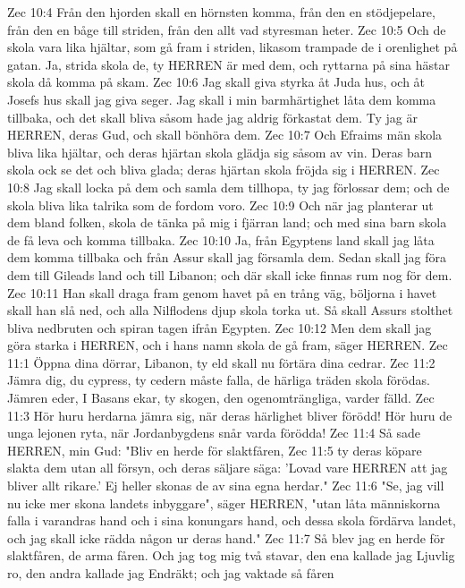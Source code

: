 Zec 10:4  Från den hjorden skall en hörnsten komma, från den en stödjepelare, från den en båge till striden, från den allt vad styresman heter.
Zec 10:5  Och de skola vara lika hjältar, som gå fram i striden, likasom trampade de i orenlighet på gatan. Ja, strida skola de, ty HERREN är med dem, och ryttarna på sina hästar skola då komma på skam.
Zec 10:6  Jag skall giva styrka åt Juda hus, och åt Josefs hus skall jag giva seger. Jag skall i min barmhärtighet låta dem komma tillbaka, och det skall bliva såsom hade jag aldrig förkastat dem. Ty jag är HERREN, deras Gud, och skall bönhöra dem.
Zec 10:7  Och Efraims män skola bliva lika hjältar, och deras hjärtan skola glädja sig såsom av vin. Deras barn skola ock se det och bliva glada; deras hjärtan skola fröjda sig i HERREN.
Zec 10:8  Jag skall locka på dem och samla dem tillhopa, ty jag förlossar dem; och de skola bliva lika talrika som de fordom voro.
Zec 10:9  Och när jag planterar ut dem bland folken, skola de tänka på mig i fjärran land; och med sina barn skola de få leva och komma tillbaka.
Zec 10:10  Ja, från Egyptens land skall jag låta dem komma tillbaka och från Assur skall jag församla dem. Sedan skall jag föra dem till Gileads land och till Libanon; och där skall icke finnas rum nog för dem.
Zec 10:11  Han skall draga fram genom havet på en trång väg, böljorna i havet skall han slå ned, och alla Nilflodens djup skola torka ut. Så skall Assurs stolthet bliva nedbruten och spiran tagen ifrån Egypten.
Zec 10:12  Men dem skall jag göra starka i HERREN, och i hans namn skola de gå fram, säger HERREN.
Zec 11:1  Öppna dina dörrar, Libanon, ty eld skall nu förtära dina cedrar.
Zec 11:2  Jämra dig, du cypress, ty cedern måste falla, de härliga träden skola förödas. Jämren eder, I Basans ekar, ty skogen, den ogenomträngliga, varder fälld.
Zec 11:3  Hör huru herdarna jämra sig, när deras härlighet bliver förödd! Hör huru de unga lejonen ryta, när Jordanbygdens snår varda förödda!
Zec 11:4  Så sade HERREN, min Gud: "Bliv en herde för slaktfåren,
Zec 11:5  ty deras köpare slakta dem utan all försyn, och deras säljare säga: 'Lovad vare HERREN att jag bliver allt rikare.' Ej heller skonas de av sina egna herdar."
Zec 11:6  "Se, jag vill nu icke mer skona landets inbyggare", säger HERREN, "utan låta människorna falla i varandras hand och i sina konungars hand, och dessa skola fördärva landet, och jag skall icke rädda någon ur deras hand."
Zec 11:7  Så blev jag en herde för slaktfåren, de arma fåren. Och jag tog mig två stavar, den ena kallade jag Ljuvlig ro, den andra kallade jag Endräkt; och jag vaktade så fåren
